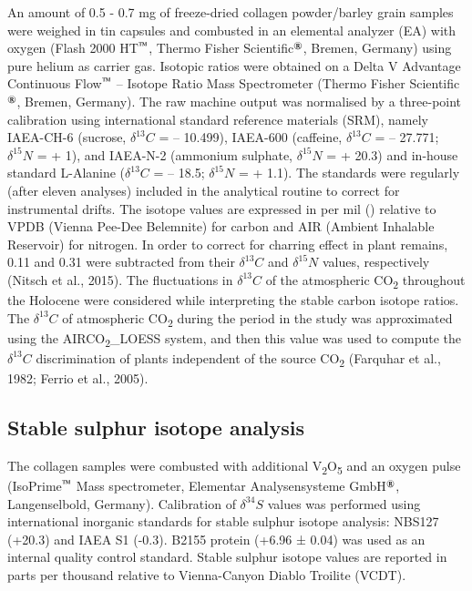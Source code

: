 \documentclass[review]{elsarticle} %
\begin{document}
An amount of 0.5 - 0.7 mg of freeze-dried collagen powder/barley grain samples were weighed in tin capsules and combusted in an elemental analyzer (EA) with oxygen (Flash 2000 HT\(^\text{\texttrademark}\), Thermo Fisher Scientific\(^\text{\textregistered}\), Bremen, Germany) using pure helium as carrier gas. Isotopic ratios were obtained on a Delta V Advantage Continuous Flow\(^\text{\texttrademark}\) -- Isotope Ratio Mass Spectrometer (Thermo Fisher Scientific\(^\text{\textregistered}\), Bremen, Germany). The raw machine output was normalised by a three-point calibration using international standard reference materials (SRM), namely IAEA-CH-6 (sucrose, \(\delta ^{13}C\) = -- 10.499\text{\textperthousand}), IAEA-600 (caffeine, \(\delta ^{13}C\) = -- 27.771\text{\textperthousand}; \(\delta ^{15}N\) = + 1\text{\textperthousand}), and IAEA-N-2 (ammonium sulphate, \(\delta ^{15}N\) = + 20.3\text{\textperthousand}) and in-house standard L-Alanine (\(\delta ^{13}C\) = -- 18.5\text{\textperthousand}; \(\delta ^{15}N\) = + 1.1\text{\textperthousand}). The standards were regularly (after eleven analyses) included in the analytical routine to correct for instrumental drifts. The isotope values are expressed in per mil (\text{\textperthousand}) relative to VPDB (Vienna Pee-Dee Belemnite) for carbon and AIR (Ambient Inhalable Reservoir) for nitrogen. In order to correct for charring effect in plant remains, 0.11\text{\textperthousand} and 0.31\text{\textperthousand} were subtracted from their \(\delta ^{13}C\) and \(\delta ^{15}N\) values, respectively (Nitsch et al., 2015). The fluctuations in \(\delta ^{13}C\) of the atmospheric CO\textsubscript{2} throughout the Holocene were considered while interpreting the stable carbon isotope ratios. The \(\delta ^{13}C\) of atmospheric CO\textsubscript{2} during the period in the study was approximated using the AIRCO\textsubscript{2}\_LOESS system, and then this value was used to compute the \(\delta ^{13}C\) discrimination of plants independent of the source CO\textsubscript{2} (Farquhar et al., 1982; Ferrio et al., 2005).

\hypertarget{stable-sulphur-isotope-analysis}{%
\subsection{Stable sulphur isotope analysis}\label{stable-sulphur-isotope-analysis}}

The collagen samples were combusted with additional V\textsubscript{2}O\textsubscript{5} and an oxygen pulse (IsoPrime\(^\text{\texttrademark}\) Mass spectrometer, Elementar Analysensysteme GmbH\(^\text{\textregistered}\), Langenselbold, Germany). Calibration of \(\delta ^{34}S\) values was performed using international inorganic standards for stable sulphur isotope analysis: NBS127 (+20.3\text{\textperthousand}) and IAEA S1 (-0.3\text{\textperthousand}). B2155 protein (+6.96 ± 0.04\text{\textperthousand}) was used as an internal quality control standard. Stable sulphur isotope values are reported in parts per thousand relative to Vienna-Canyon Diablo Troilite (VCDT).
\end{document}
